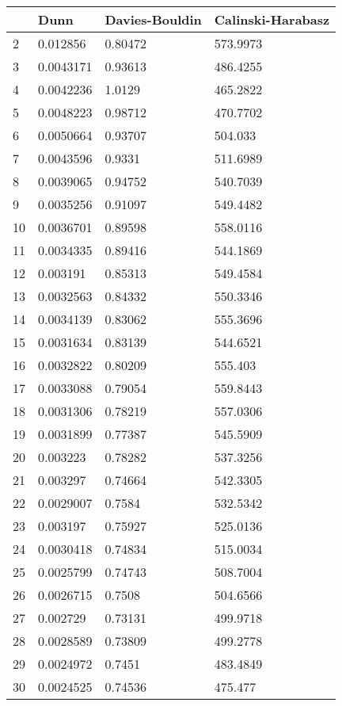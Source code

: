 \begin{tabular}{llll}
& Dunn & Davies-Bouldin & Calinski-Harabasz \\ 
\hline 
2 & 0.012856 & 0.80472 & 573.9973 \\ 
3 & 0.0043171 & 0.93613 & 486.4255 \\ 
4 & 0.0042236 & 1.0129 & 465.2822 \\ 
5 & 0.0048223 & 0.98712 & 470.7702 \\ 
6 & 0.0050664 & 0.93707 & 504.033 \\ 
7 & 0.0043596 & 0.9331 & 511.6989 \\ 
8 & 0.0039065 & 0.94752 & 540.7039 \\ 
9 & 0.0035256 & 0.91097 & 549.4482 \\ 
10 & 0.0036701 & 0.89598 & 558.0116 \\ 
11 & 0.0034335 & 0.89416 & 544.1869 \\ 
12 & 0.003191 & 0.85313 & 549.4584 \\ 
13 & 0.0032563 & 0.84332 & 550.3346 \\ 
14 & 0.0034139 & 0.83062 & 555.3696 \\ 
15 & 0.0031634 & 0.83139 & 544.6521 \\ 
16 & 0.0032822 & 0.80209 & 555.403 \\ 
17 & 0.0033088 & 0.79054 & 559.8443 \\ 
18 & 0.0031306 & 0.78219 & 557.0306 \\ 
19 & 0.0031899 & 0.77387 & 545.5909 \\ 
20 & 0.003223 & 0.78282 & 537.3256 \\ 
21 & 0.003297 & 0.74664 & 542.3305 \\ 
22 & 0.0029007 & 0.7584 & 532.5342 \\ 
23 & 0.003197 & 0.75927 & 525.0136 \\ 
24 & 0.0030418 & 0.74834 & 515.0034 \\ 
25 & 0.0025799 & 0.74743 & 508.7004 \\ 
26 & 0.0026715 & 0.7508 & 504.6566 \\ 
27 & 0.002729 & 0.73131 & 499.9718 \\ 
28 & 0.0028589 & 0.73809 & 499.2778 \\ 
29 & 0.0024972 & 0.7451 & 483.4849 \\ 
30 & 0.0024525 & 0.74536 & 475.477 \\ 
\hline 
\end{tabular}